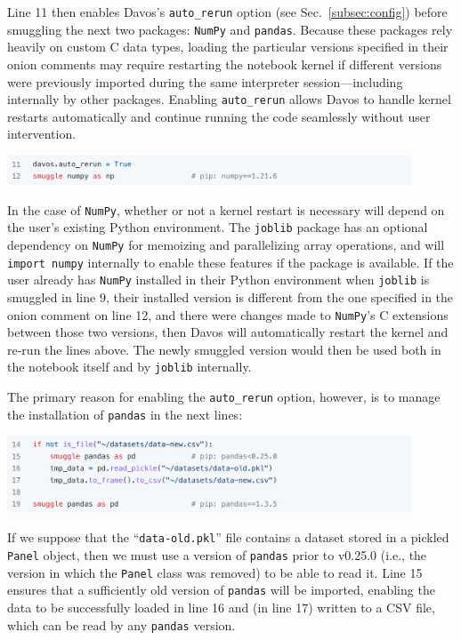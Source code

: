 \documentclass[preprint,12pt,a4paper]{elsarticle}
\begin{document}
Line 11 then enables
Davos's \texttt{auto\_rerun} option (see Sec.~\ref{subsec:config}) before smuggling the next
two packages: \texttt{NumPy} and
\texttt{pandas}. Because these packages rely heavily on custom C data
types, loading the particular versions specified in their onion comments may
require restarting the notebook kernel if different versions were previously
imported during the same interpreter session---including internally by other packages.
Enabling \texttt{auto\_rerun} allows Davos to handle kernel restarts automatically and continue running the code seamlessly without user intervention.
\begin{center}
\includegraphics[width=0.9\textwidth]{figs/example3}
\end{center}
In the case of \texttt{NumPy}, whether or not a kernel restart is necessary will depend on the user's existing Python environment.
The \texttt{joblib} package has an optional dependency on \texttt{NumPy} for memoizing and parallelizing array operations, and will \texttt{import numpy} internally to enable these features if the package is available.
If the user already has \texttt{NumPy} installed in their Python environment when \texttt{joblib} is smuggled in line 9, their installed version is different from the one specified in the onion comment on line 12, and there were changes made to \texttt{NumPy}'s C extensions between those two versions, then Davos will automatically restart the kernel and re-run the lines above.
The newly smuggled version would then be used both in the notebook itself and by \texttt{joblib} internally.

The primary reason for enabling the \texttt{auto\_rerun} option, however, is to manage the installation of \texttt{pandas} in the next lines:
\begin{center}
\includegraphics[width=0.9\textwidth]{figs/example4}
\end{center}
If we suppose that the ``\texttt{data-old.pkl}'' file contains a dataset
stored in a pickled \texttt{Panel} object, then we must use a version of
\texttt{pandas} prior to v0.25.0 (i.e., the version in which the \texttt{Panel}
class was removed) to be able to read it. Line 15 ensures
that a sufficiently old version of \texttt{pandas} will be imported, enabling
the data to be successfully loaded in line 16 and (in line 17) written to a CSV
file, which can be read by any \texttt{pandas} version.
\end{document}
